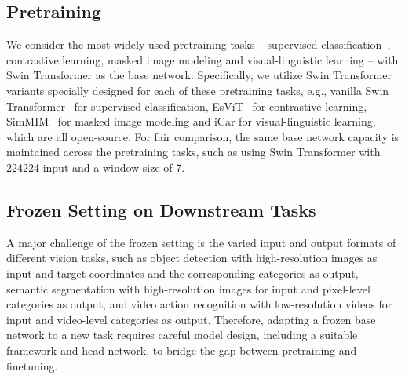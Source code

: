 \documentclass{article}
\begin{document}
\subsection{Pretraining}

We consider the most widely-used pretraining tasks -- supervised classification~\cite{liu2021swin,swinv2}, contrastive learning, masked image modeling and visual-linguistic learning -- with Swin Transformer as the base network. Specifically, we utilize Swin Transformer variants specially designed for each of these pretraining tasks, e.g., vanilla Swin Transformer~\cite{liu2021swin,swinv2} for supervised classification, EsViT~\cite{esvit} for contrastive learning, SimMIM~\cite{xie2021simmim} for masked image modeling and iCar\cite{yixuan2022icar} for visual-linguistic learning, which are all open-source.
For fair comparison, the same base network capacity is maintained across the pretraining tasks, such as using Swin Transformer with 224224 input and a window size of 7.

\subsection{Frozen Setting on Downstream Tasks} 
A major challenge of the frozen setting is the varied input and output formats of different vision tasks, such as object detection with high-resolution images as input and target coordinates and the corresponding categories as output, semantic segmentation with high-resolution images for input and pixel-level categories as output, and video action recognition with low-resolution videos for input and video-level categories as output. 
Therefore, adapting a frozen base network to a new task requires careful model design, including a suitable framework and head network, to bridge the gap between pretraining and finetuning.
\end{document}
